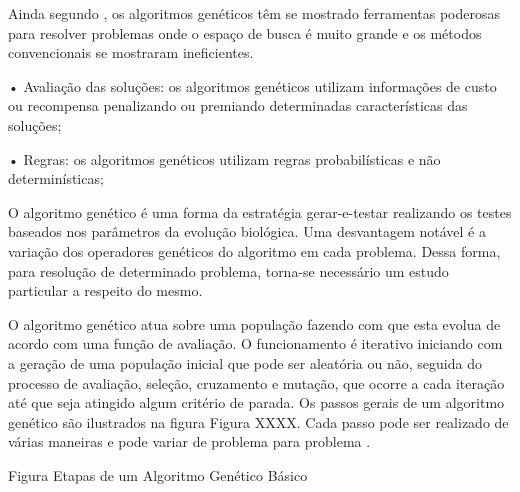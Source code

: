 \documentclass{abntpuc}
\begin{document}
Ainda segundo \cite{oliveira2005algoritmo}, os algoritmos genéticos têm se mostrado ferramentas poderosas para resolver problemas onde o espaço de busca é muito grande e os métodos convencionais se mostraram ineficientes.\par


•  Avaliação das soluções: os algoritmos genéticos utilizam informações de custo ou recompensa penalizando ou premiando determinadas características das soluções; \par

•  Regras: os algoritmos genéticos utilizam regras probabilísticas e não determinísticas; \par

O algoritmo genético é uma forma da estratégia gerar-e-testar realizando os testes baseados nos parâmetros da evolução biológica. Uma desvantagem notável é a variação dos operadores genéticos do algoritmo em cada problema. Dessa forma, para resolução de determinado problema, torna-se necessário um estudo particular a respeito do mesmo. \par

O algoritmo genético atua sobre uma população fazendo com que esta evolua de acordo com uma função de avaliação. O funcionamento é iterativo iniciando com a geração de uma população inicial que pode ser aleatória ou não, seguida do processo de avaliação, seleção, cruzamento e mutação, que ocorre a cada iteração até que seja atingido algum critério de parada. Os passos gerais de um algoritmo genético são ilustrados na figura 
Figura XXXX. Cada passo pode ser realizado de várias maneiras e pode variar de problema para problema \cite{timoteo2005desenvolvimento}.\par 

Figura Etapas de um Algoritmo Genético Básico 
%
\end{document}

